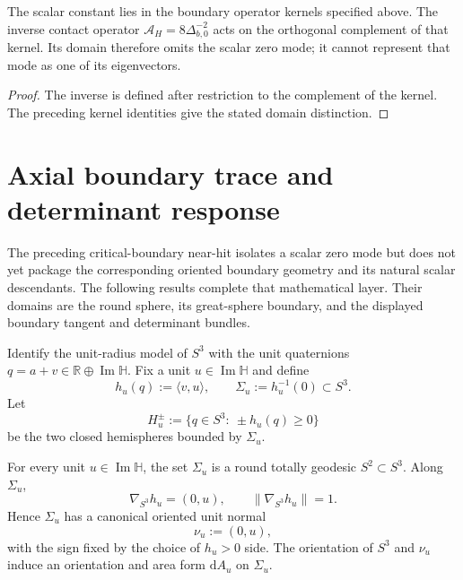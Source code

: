 \documentclass[11pt]{article}
\begin{document}
\begin{corollary}
\label{p1:cor:v167-critical-mode-owner-firewall}
The scalar constant lies in the boundary operator kernels specified above.
The inverse contact operator $\mathcal A_H=8\Delta_{b,0}^{-2}$ acts on the
orthogonal complement of that kernel. Its domain therefore omits the scalar
zero mode; it cannot represent that mode as one of its eigenvectors.
\end{corollary}
\begin{proof}
The inverse is defined after restriction to the complement of the kernel.
The preceding kernel identities give the stated domain distinction.
\end{proof}

\section{Axial boundary trace and determinant response}
\label{p1:sec:v557-boundary-process-package}

The preceding critical-boundary near-hit isolates a scalar zero mode but does
not yet package the corresponding oriented boundary geometry and its natural
scalar descendants.  The following results complete that mathematical layer.
Their domains are the round sphere, its great-sphere boundary, and the
displayed boundary tangent and determinant bundles.

\begin{definition}
\label{p1:def:v557-axial-great-sphere-boundary}
Identify the unit-radius model of $S^3$ with the unit quaternions
$q=a+v\in\mathbb R\oplus\operatorname{Im}\mathbb H$.  Fix a unit
$u\in\operatorname{Im}\mathbb H$ and define
\[
 h_u(q):=\langle v,u\rangle,
 \qquad
 \Sigma_u:=h_u^{-1}(0)\subset S^3.
\]
Let
\[
 H_u^\pm:=\{q\in S^3:\ \pm h_u(q)\ge0\}
\]
be the two closed hemispheres bounded by $\Sigma_u$.
\end{definition}

\begin{theorem}
\label{p1:thm:v557-axial-boundary-normal}
For every unit $u\in\operatorname{Im}\mathbb H$, the set $\Sigma_u$ is a
round totally geodesic $S^2\subset S^3$.  Along $\Sigma_u$,
\[
 \nabla_{S^3}h_u=(0,u),
 \qquad
 \|\nabla_{S^3}h_u\|=1.
\]
Hence $\Sigma_u$ has a canonical oriented unit normal
\[
 \nu_u:=(0,u),
\]
with the sign fixed by the choice of $h_u>0$ side.  The orientation of $S^3$
and $\nu_u$ induce an orientation and area form $\mathrm dA_u$ on $\Sigma_u$.
\end{theorem}
\end{document}
